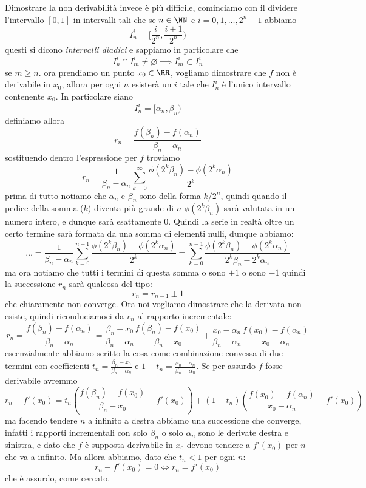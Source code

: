 \documentclass[11pt]{scrartcl}
\newcommand{\eset}{\varnothing}
\begin{document}
	 Dimostrare la non derivabilità invece è più difficile, cominciamo con il dividere l'intervallo $[0,1]$ in intervalli tali che se $n\in\NN$ e $i=0,1,\dots,2^n-1$ abbiamo
	 $$I_n^i=\bigg[\frac{i}{2^n},\frac{i+1}{2^n}\bigg)$$
	 questi si dicono \textit{intervalli diadici} e sappiamo in particolare che 
	 $$I^i_n\cap I^i_m\ne\eset \implies I^i_m\subset I_n^i$$
	 se $m\ge n$.
	 ora prendiamo un punto $x_0\in\RR$, vogliamo dimostrare che $f$ non è derivabile in $x_0$, allora per ogni $n$ esisterà un $i$ tale che $I_n^i$ è l'unico intervallo contenente $x_0$. In particolare siano
	 $$I_n^i=[\alpha_n,\beta_n)$$
	 definiamo allora
	 $$r_n=\frac{f(\beta_n)-f(\alpha_n)}{\beta_n-\alpha_n}$$
	 sostituendo dentro l'espressione per $f$ troviamo
	 $$r_n=\frac{1}{\beta_n-\alpha_n}\sum_{k=0}^{\infty}\frac{\phi(2^k\beta_n)-\phi(2^k\alpha_n)}{2^k}$$
	 prima di tutto notiamo che $\alpha_n$ e $\beta_n$ sono della forma $k/2^n$, quindi quando il pedice della somma ($k$) diventa più grande di $n$ $\phi(2^k\beta_n)$ sarà valutata in un numero intero, e dunque sarà esattamente $0$. Quindi la serie in realtà oltre un certo termine sarà formata da una somma di elementi nulli, dunque abbiamo:
	 $$\dots=\frac{1}{\beta_n-\alpha_n}\sum_{k=0}^{n-1}\frac{\phi(2^k\beta_n)-\phi(2^k\alpha_n)}{2^k}=\sum_{k=0}^{n-1}\frac{\phi(2^k\beta_n)-\phi(2^k\alpha_n)}{2^k\beta_n-2^k\alpha_n}$$
	 ma ora notiamo che tutti i termini di questa somma o sono $+1$ o sono $-1$ quindi la successione $r_n$ sarà qualcosa del tipo:
	 $$r_n=r_{n-1}\pm 1$$
	 che chiaramente non converge. Ora noi vogliamo dimostrare che la derivata non esiste, quindi riconduciamoci da $r_n$ al rapporto incrementale:
	 $$r_n=\frac{f(\beta_n)-f(\alpha_n)}{\beta_n-\alpha_n}=\frac{\beta_n-x_0}{\beta_n-\alpha_n}\frac{f(\beta_n)-f(x_0)}{\beta_n-x_0}+\frac{x_0-\alpha_n}{\beta_n-\alpha_n}\frac{f(x_0)-f(\alpha_n)}{x_0-\alpha_n}$$
	 eseenzialmente abbiamo scritto la cosa come combinazione convessa di due termini con coefficienti $t_n=\frac{\beta_n-x_0}{\beta_n-\alpha_n}$ e $1-t_n=\frac{x_0-\alpha_n}{\beta_n-\alpha_n}$. Se per assurdo $f$ fosse derivabile avremmo
	 $$r_n-f'(x_0)=t_n\left(\frac{f(\beta_n)-f(x_0)}{\beta_n-x_0}-f'(x_0)\right)+(1-t_n)\left(\frac{f(x_0)-f(\alpha_n)}{x_0-\alpha_n}-f'(x_0)\right)$$
	 ma facendo tendere $n$ a infinito a destra abbiamo una successione che converge, infatti i rapporti incrementali con solo $\beta_n$ o solo $\alpha_n$ sono le derivate destra e sinistra, e dato che $f$ è supposta derivabile in $x_0$ devono tendere a $f'(x_0)$ per $n$ che va a infinito. Ma allora abbiamo, dato che $t_n<1$ per ogni $n$:
	 $$r_n-f'(x_0)=0 \iff r_n=f'(x_0)$$
	 che è assurdo, come cercato.
\end{document}
